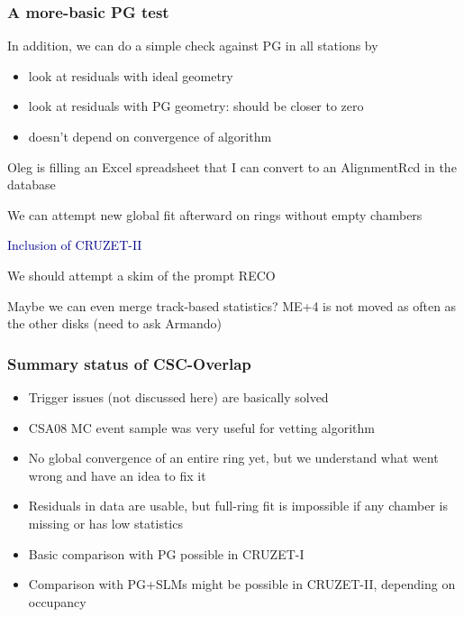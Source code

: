 \documentclass[compress]{beamer}
\begin{document}
\begin{frame}
\frametitle{A more-basic PG test}

In addition, we can do a simple check against PG in all stations by 
\begin{itemize}
\item look at residuals with ideal geometry
\item look at residuals with PG geometry: should be closer to zero
\item doesn't depend on convergence of algorithm
\end{itemize}

\vspace{0.2 cm}
Oleg is filling an Excel spreadsheet that I can convert to an AlignmentRcd in the database

\vspace{0.2 cm}
We can attempt new global fit afterward on rings without empty chambers

\vfill
\hspace{-0.83 cm} \textcolor{darkblue}{\Large Inclusion of CRUZET-II}

\vspace{0.2 cm}
We should attempt a skim of the prompt RECO

\vspace{0.2 cm}
Maybe we can even merge track-based statistics?  ME+4 is not moved as often as the other disks (need to ask Armando)
\end{frame}


\begin{frame}
\frametitle{Summary status of CSC-Overlap}

\begin{itemize}\setlength{\itemsep}{0.3 cm}
\item Trigger issues (not discussed here) are basically solved
\item CSA08 MC event sample was very useful for vetting algorithm
\item No global convergence of an entire ring yet, but we understand what went wrong and have an idea to fix it
\item Residuals in data are usable, but full-ring fit is impossible if any chamber is missing or has low statistics
\item Basic comparison with PG possible in CRUZET-I
\item Comparison with PG+SLMs might be possible in CRUZET-II, depending on occupancy
\end{itemize}

\label{numpages}
\end{frame}
\end{document}
